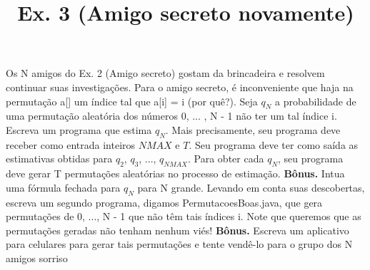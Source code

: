 \documentclass{article}
\title{Ex. 3 (Amigo secreto novamente)}
\date{}
\author{}
\begin{document}
\maketitle

Os N amigos do Ex. 2 (Amigo secreto) gostam da brincadeira e resolvem continuar suas investiga\c{c}\~oes. Para o amigo secreto, \'e inconveniente que haja na permuta\c{c}\~ao a[] um \'indice tal que a[i] = i (por qu\^e?).
\bigbreak
Seja $q_N$ a probabilidade de uma permuta\c{c}\~ao aleat\'oria dos n\'umeros 0, ... , N - 1 n\~ao ter um tal \'indice i. Escreva um programa que estima $q_N$.
\bigbreak
Mais precisamente, seu programa deve receber como entrada inteiros $NMAX$ e $T$. Seu programa deve ter como sa\'ida as estimativas obtidas para $q_2$, $q_3$, ..., $q_{NMAX}$. Para obter cada $q_N$, seu programa deve gerar T permuta\c{c}\~oes aleat\'orias no processo de estima\c{c}\~ao.
\bigbreak
\textbf{B\^onus.} Intua uma f\'ormula fechada para $q_N$ para N grande.
\bigbreak
Levando em conta suas descobertas, escreva um segundo programa, digamos PermutacoesBoas.java, que gera permutações de 0, ..., N - 1 que n\~ao t\^em tais \'indices i. Note que queremos que as permuta\c{c}\~oes geradas n\~ao tenham nenhum vi\'es!
\bigbreak
\textbf{B\^onus.} Escreva um aplicativo para celulares para gerar tais permuta\c{c}\~oes e tente vend\^e-lo para o grupo dos N amigos sorriso
\end{document}
